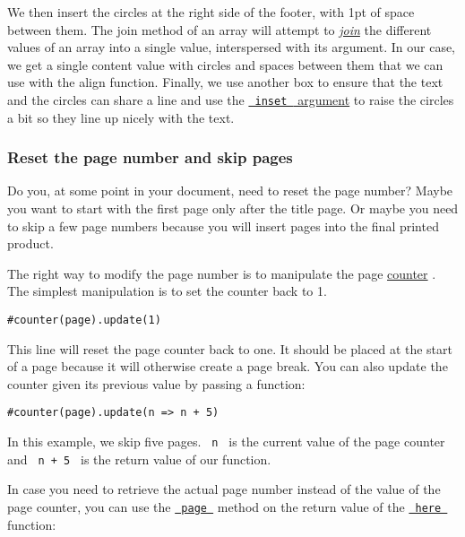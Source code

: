 We then insert the circles at the right side of the footer, with 1pt of
space between them. The join method of an array will attempt to
\href{/docs/reference/scripting/\#blocks}{\emph{join}} the different
values of an array into a single value, interspersed with its argument.
In our case, we get a single content value with circles and spaces
between them that we can use with the align function. Finally, we use
another box to ensure that the text and the circles can share a line and
use the
\href{/docs/reference/layout/box/\#parameters-inset}{\texttt{\ inset\ }
argument} to raise the circles a bit so they line up nicely with the
text.

\subsubsection{Reset the page number and skip pages}\label{skip-pages}

Do you, at some point in your document, need to reset the page number?
Maybe you want to start with the first page only after the title page.
Or maybe you need to skip a few page numbers because you will insert
pages into the final printed product.

The right way to modify the page number is to manipulate the page
\href{/docs/reference/introspection/counter/}{counter} . The simplest
manipulation is to set the counter back to 1.

\begin{verbatim}
#counter(page).update(1)
\end{verbatim}

This line will reset the page counter back to one. It should be placed
at the start of a page because it will otherwise create a page break.
You can also update the counter given its previous value by passing a
function:

\begin{verbatim}
#counter(page).update(n => n + 5)
\end{verbatim}

In this example, we skip five pages. \texttt{\ n\ } is the current value
of the page counter and \texttt{\ n\ +\ 5\ } is the return value of our
function.

In case you need to retrieve the actual page number instead of the value
of the page counter, you can use the
\href{/docs/reference/introspection/location/\#definitions-page}{\texttt{\ page\ }}
method on the return value of the
\href{/docs/reference/introspection/here/}{\texttt{\ here\ }} function:

